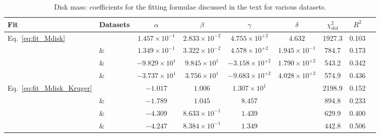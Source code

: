 \begin{table*}
    \caption{
        \label{tab:diskfit:form}
        Disk mass: coefficients for the fitting formulae discussed in the text for various datasets. }
    \begin{tabular}{l|l|ccccccc}
        \hline\hline
        Fit & Datasets & $\alpha$ & $\beta$ & $\gamma$ & $\delta$  & $\chi^2 _{\text{dof}}$ & $R^2$ \\
        \hline
        Eq.~\eqref{eq:fit_Mdisk} & \DSrefset{} & $1.457\times10^{-1}$ & $2.833\times10^{-2}$ & $4.755\times10^{+2}$ & $4.632$ & 1927.3 & 0.103 \\ 
        & \& \DSheatcool{} & $1.349\times10^{-1}$ & $3.322\times10^{-2}$ & $4.578\times10^{+2}$ & $1.945\times10^{-1}$ & 784.7 & 0.173 \\ 
        & \& \DScool{} & $-9.829\times10^{1}$ & $9.845\times10^{1}$ & $-3.158\times10^{+2}$ & $1.790\times10^{+2}$ & 543.2 & 0.342 \\ 
        & \& \DSnone{} & $-3.737\times10^{1}$ & $3.756\times10^{1}$ & $-9.683\times10^{+2}$ & $4.028\times10^{+2}$ & 574.9 & 0.436 \\ 
        \hline
        Eq.~\eqref{eq:fit_Mdisk_Kruger} & \DSrefset{} & $-1.017$ & $1.006$ & $1.307\times10^{1}$ & & 2198.9 & 0.152 \\ 
        & \& \DSheatcool{} & $-1.789$ & $1.045$ & $8.457$ & & 894.8 & 0.233 \\ 
        & \& \DScool{} & $-4.309$ & $8.633\times10^{-1}$ & $1.439$ & & 629.9 & 0.400 \\ 
        & \& \DSnone{} & $-4.247$ & $8.384\times10^{-1}$ & $1.349$ & & 442.8 & 0.506 \\ 
        \hline
        \hline\hline
    \end{tabular}
\end{table*}

